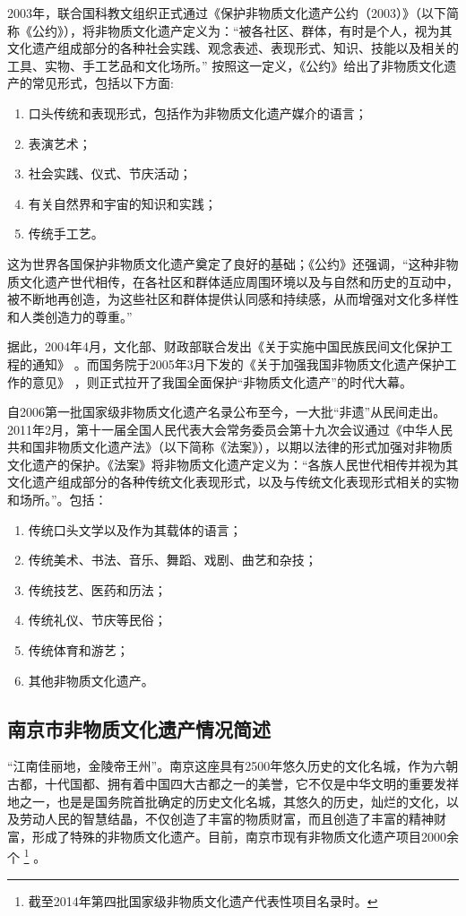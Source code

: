 \documentclass[12pt]{article}%
\begin{document}
2003年，联合国科教文组织正式通过《保护非物质文化遗产公约（2003）》（以下简称《公约》），将非物质文化遗产定义为：“被各社区、群体，有时是个人，视为其文化遗产组成部分的各种社会实践、观念表述、表现形式、知识、技能以及相关的工具、实物、手工艺品和文化场所。”
按照这一定义，《公约》给出了非物质文化遗产的常见形式，包括以下方面:
 \begin{enumerate}[ (a).]
\item 口头传统和表现形式，包括作为非物质文化遗产媒介的语言；
\item 表演艺术；
\item 社会实践、仪式、节庆活动；
\item 有关自然界和宇宙的知识和实践；
\item 传统手工艺。
\end{enumerate}
这为世界各国保护非物质文化遗产奠定了良好的基础；《公约》还强调，“这种非物质文化遗产世代相传，在各社区和群体适应周围环境以及与自然和历史的互动中，被不断地再创造，为这些社区和群体提供认同感和持续感，从而增强对文化多样性和人类创造力的尊重。”

据此，2004年4月，文化部、财政部联合发出《关于实施中国民族民间文化保护工程的通知》
。而国务院于2005年3月下发的《关于加强我国非物质文化遗产保护工作的意见》
，则正式拉开了我国全面保护“非物质文化遗产”的时代大幕。

自2006第一批国家级非物质文化遗产名录公布至今，一大批“非遗”从民间走出。2011年2月，第十一届全国人民代表大会常务委员会第十九次会议通过《中华人民共和国非物质文化遗产法》（以下简称《法案》），以期以法律的形式加强对非物质文化遗产的保护。《法案》将非物质文化遗产定义为：“各族人民世代相传并视为其文化遗产组成部分的各种传统文化表现形式，以及与传统文化表现形式相关的实物和场所。”。包括：
    \begin{enumerate}[ (a).]
      \item 传统口头文学以及作为其载体的语言；
      \item 传统美术、书法、音乐、舞蹈、戏剧、曲艺和杂技；
      \item 传统技艺、医药和历法；
      \item 传统礼仪、节庆等民俗；
      \item 传统体育和游艺；
      \item 其他非物质文化遗产。
    \end{enumerate}
\subsection{南京市非物质文化遗产情况简述}

“江南佳丽地，金陵帝王州”。南京这座具有2500年悠久历史的文化名城，作为六朝古都，十代国都、拥有着中国四大古都之一的美誉，它不仅是中华文明的重要发祥地之一，也是是国务院首批确定的历史文化名城，其悠久的历史，灿烂的文化，以及劳动人民的智慧结晶，不仅创造了丰富的物质财富，而且创造了丰富的精神财富，形成了特殊的非物质文化遗产。目前，南京市现有非物质文化遗产项目2000余个
\footnote{
截至2014年第四批国家级非物质文化遗产代表性项目名录时。
}
。%
\end{document}
